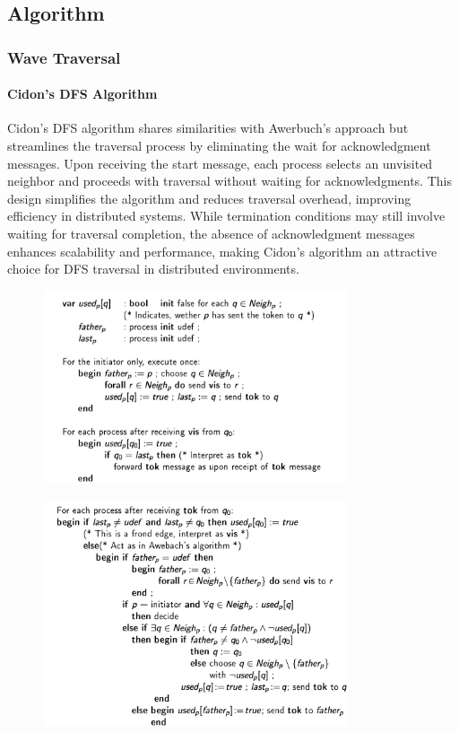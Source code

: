 \documentclass[11pt]{beamer}              %
\begin{document}
\subsection{Algorithm}

\begin{frame}
\frametitle{Wave Traversal}
\framesubtitle{Cidon's DFS Algorithm}
Cidon's DFS algorithm shares similarities with Awerbuch's approach but streamlines the traversal process by eliminating the wait for acknowledgment messages.
 Upon receiving the start message, each process selects an unvisited neighbor and proceeds with traversal without waiting for acknowledgments.
 This design simplifies the algorithm and reduces traversal overhead, improving efficiency in distributed systems.
 While termination conditions may still involve waiting for traversal completion, the absence of acknowledgment messages enhances scalability and performance, making Cidon's algorithm an attractive choice for DFS traversal in distributed environments.
\end{frame}

\begin{frame}
\begin{figure}
    \centering
    \includegraphics[width=0.8\textwidth]{figures/cidon1.jpg}
\end{figure}
\end{frame}

\begin{frame}
\begin{figure}
    \centering
    \includegraphics[width=0.8\textwidth]{figures/cidon2.jpg}
\end{figure}
\end{frame}
\end{document}
